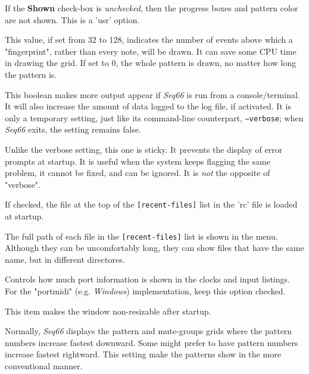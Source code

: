    If the \textbf{Shown} check-box
   is \textsl{unchecked}, then the progress boxes and pattern color are not
   shown.
   This is a 'usr' option.

   This value, if set from 32 to 128, indicates the number of events above
   which a "fingerprint", rather than every note, will be drawn.  It can
   save some CPU time in drawing the grid.  If set to 0, the whole
   pattern is drawn, no matter how long the pattern is.

   This boolean makes more output appear if \textsl{Seq66} is run from a
   console/terminal. It will also increase the amount of data logged to the log
   file, if activated. It is only a temporary setting, just like
   its command-line counterpart, \texttt{--verbose}; when
   \textsl{Seq66} exits, the setting remains false.

   Unlike the verbose setting, this one is sticky.
   It prevents the display of error prompts at startup.
   It is useful when the system keeps flagging the same problem,
   it cannot be fixed, and can be ignored.
   It is \textsl{not} the opposite of "verbose".

   If checked, the file at the top of the \texttt{[recent-files]}
   list in the 'rc' file is loaded at startup.

   The full path of each file in the \texttt{[recent-files]} list
   is shown in the menu.  Although they can be uncomfortably long, they can
   show files that have the same name, but in different directores.

   Controls how much port information is shown in the clocks and input
   listings.  For the "portmidi" (e.g. \textsl{Windows})
   implementation, keep this option checked.

   This item makes the window non-resizable after startup.

   Normally, \textsl{Seq66} displays the pattern and mute-groups grids
   where the pattern numbers increase fastest downward.
   Some might prefer to have pattern numbers increase fastest rightward.
   This setting make the patterns show in the more conventional manner.

